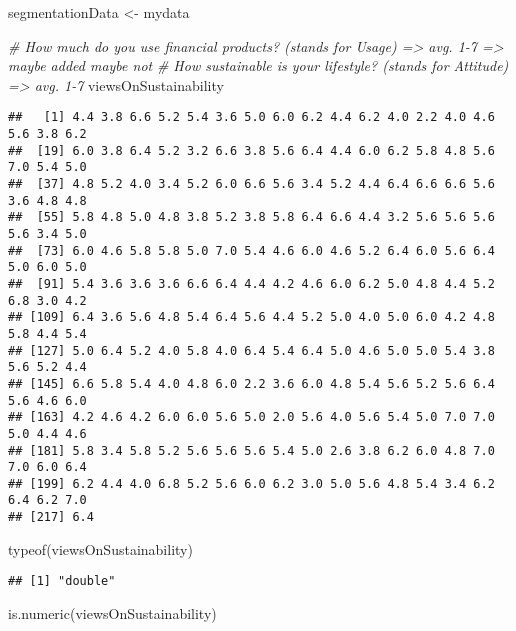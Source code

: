 \documentclass[
]{article}
\newenvironment{Shaded}{\begin{snugshade}}{\end{snugshade}}
\newcommand{\CommentTok}[1]{\textcolor[rgb]{0.56,0.35,0.01}{\textit{#1}}}
\newcommand{\FunctionTok}[1]{\textcolor[rgb]{0.00,0.00,0.00}{#1}}
\newcommand{\NormalTok}[1]{#1}
\newcommand{\OtherTok}[1]{\textcolor[rgb]{0.56,0.35,0.01}{#1}}
\begin{document}
\begin{Shaded}
\begin{Highlighting}[]
\NormalTok{segmentationData }\OtherTok{\textless{}{-}}\NormalTok{ mydata}

\CommentTok{\# How much do you use financial products? (stands for Usage) =\textgreater{} avg. 1{-}7 =\textgreater{} maybe added maybe not}
\CommentTok{\# How sustainable is your lifestyle? (stands for Attitude) =\textgreater{} avg. 1{-}7}
\NormalTok{viewsOnSustainability}
\end{Highlighting}
\end{Shaded}

\begin{verbatim}
##   [1] 4.4 3.8 6.6 5.2 5.4 3.6 5.0 6.0 6.2 4.4 6.2 4.0 2.2 4.0 4.6 5.6 3.8 6.2
##  [19] 6.0 3.8 6.4 5.2 3.2 6.6 3.8 5.6 6.4 4.4 6.0 6.2 5.8 4.8 5.6 7.0 5.4 5.0
##  [37] 4.8 5.2 4.0 3.4 5.2 6.0 6.6 5.6 3.4 5.2 4.4 6.4 6.6 6.6 5.6 3.6 4.8 4.8
##  [55] 5.8 4.8 5.0 4.8 3.8 5.2 3.8 5.8 6.4 6.6 4.4 3.2 5.6 5.6 5.6 5.6 3.4 5.0
##  [73] 6.0 4.6 5.8 5.8 5.0 7.0 5.4 4.6 6.0 4.6 5.2 6.4 6.0 5.6 6.4 5.0 6.0 5.0
##  [91] 5.4 3.6 3.6 3.6 6.6 6.4 4.4 4.2 4.6 6.0 6.2 5.0 4.8 4.4 5.2 6.8 3.0 4.2
## [109] 6.4 3.6 5.6 4.8 5.4 6.4 5.6 4.4 5.2 5.0 4.0 5.0 6.0 4.2 4.8 5.8 4.4 5.4
## [127] 5.0 6.4 5.2 4.0 5.8 4.0 6.4 5.4 6.4 5.0 4.6 5.0 5.0 5.4 3.8 5.6 5.2 4.4
## [145] 6.6 5.8 5.4 4.0 4.8 6.0 2.2 3.6 6.0 4.8 5.4 5.6 5.2 5.6 6.4 5.6 4.6 6.0
## [163] 4.2 4.6 4.2 6.0 6.0 5.6 5.0 2.0 5.6 4.0 5.6 5.4 5.0 7.0 7.0 5.0 4.4 4.6
## [181] 5.8 3.4 5.8 5.2 5.6 5.6 5.6 5.4 5.0 2.6 3.8 6.2 6.0 4.8 7.0 7.0 6.0 6.4
## [199] 6.2 4.4 4.0 6.8 5.2 5.6 6.0 6.2 3.0 5.0 5.6 4.8 5.4 3.4 6.2 6.4 6.2 7.0
## [217] 6.4
\end{verbatim}

\begin{Shaded}
\begin{Highlighting}[]
\FunctionTok{typeof}\NormalTok{(viewsOnSustainability)}
\end{Highlighting}
\end{Shaded}

\begin{verbatim}
## [1] "double"
\end{verbatim}

\begin{Shaded}
\begin{Highlighting}[]
\FunctionTok{is.numeric}\NormalTok{(viewsOnSustainability)}
\end{Highlighting}
\end{Shaded}
\end{document}
